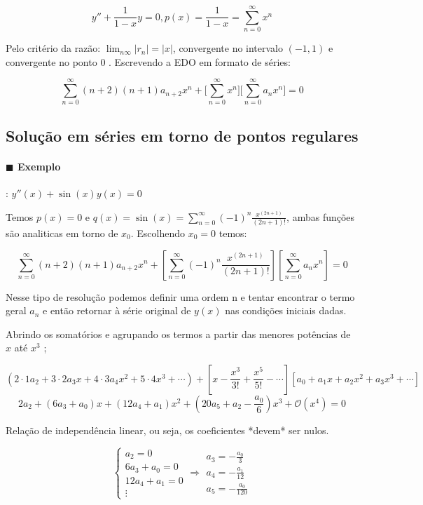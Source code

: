   \[ y'' + \frac{1}{1 - x}y = 0, p(x) = \frac{1}{1 - x} = \sum_{n = 0}^{\infty} x^n \]

  Pelo critério da razão: \( \lim_{n \infty} |r_n| = |x| \), convergente no intervalo \( (-1, 1) \)
  e convergente no ponto \( 0 \) . Escrevendo a EDO em formato de séries:

  \[ \sum_{n = 0}^{\infty} (n + 2)(n+ 1) a_{n+2} x^n + \bigg[ \sum_{n = 0}^{\infty} x^n \bigg]
  \bigg[ \sum_{n = 0}^{\infty} a_n x^n \bigg] = 0\]

\subsection{Solução em séries em torno de pontos regulares}

 \paragraph{$\blacksquare$ Exemplo}: \( y''(x) + \sin(x) y(x) = 0 \) 

    Temos \( p(x) = 0 \) e \( q(x) = \sin(x) = \sum_{n = 0}^{\infty} (-1)^n \frac{x^{(2n +
    1)}}{(2n + 1)!} \), ambas funções são analiticas em torno de \( x_0
    \). Escolhendo
    \( x_0 = 0 \) temos:

    \[ \sum_{n = 0}^{\infty} (n + 2)(n+1) a_{n + 2} x^n + \left[ \sum_{n = 0}^{\infty} (-1)^n
    \frac{x^{(2n + 1)}}{(2n + 1)!} \right] \left[ \sum_{n = 0}^{\infty} a_n x^n \right] = 0\]

    Nesse tipo de resolução podemos definir uma ordem n e tentar encontrar o termo geral \( a_n \) e
    então retornar à série original de \( y(x) \) nas condições iniciais dadas.
    

    Abrindo os somatórios e agrupando os termos a partir das menores potências de \( x \) até \( x^3 \)  ;

    \[ (2 \cdot 1 a_2 + 3 \cdot 2 a_3 x + 4 \cdot 3 a_4 x^2 + 5 \cdot  4 x^3 + \cdots) +
    \left[ x - \frac{x^3}{3!} + \frac{x^5}{5!} - \cdots  \right] \left[ a_0 + a_1 x + a_2 x^2 + a_3
    x^3 + \cdots  \right]\]
    \[ 2 a_2 + (6 a_3 + a_0) x + (12 a_4 + a_1) x^2 + (20 a_5 + a_2 - \frac{a_0}{6})x^3 +
    \mathcal{O}(x^4) = 0 \]

    Relação de independência linear, ou seja, os coeficientes *devem* ser nulos.

    \[ \begin{cases}
    a_2 = 0 \\
    6a_3 + a_0 = 0 \\
    12 a_4 + a_1 = 0 \\
    \vdots 
    \end{cases}  \Rightarrow  \begin{align} a_3 = - \frac{a_0}{3} \\ a_4 = - \frac{a_1}{12} \\ a_5
    =  - \frac{a_0}{120}\end{align}\]
  
